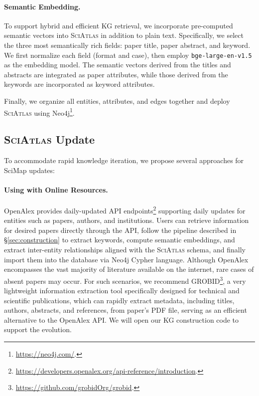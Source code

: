 \documentclass{llmxive}
\providecommand{\ours}{\textsc{SciAtlas}}
\begin{document}
\paragraph{Semantic Embedding.}
To support hybrid and efficient KG retrieval, we incorporate pre-computed semantic vectors into {\ours} in addition to plain text.
Specifically, we select the three most semantically rich fields: paper title, paper abstract, and keyword.
We first normalize each field (format and case), then employ \texttt{bge-large-en-v1.5} \citep{bge} as the embedding model.
The semantic vectors derived from the titles and abstracts are integrated as paper attributes, while those derived from the keywords are incorporated as keyword attributes.

Finally, we organize all entities, attributes, and edges together and deploy {\ours} using Neo4j\footnote{\url{https://neo4j.com/}.}.

\subsection{{\ours} Update}
To accommodate rapid knowledge iteration, we propose several approaches for SciMap updates:

\paragraph{Using with Online Resources.}
\label{sec:real_time_update}
OpenAlex provides daily-updated API endpoints\footnote{\url{https://developers.openalex.org/api-reference/introduction}.} supporting daily updates for entities such as papers, authors, and institutions. Users can retrieve information for desired papers directly through the API, follow the pipeline described in \S\ref{sec:construction} to extract keywords, compute semantic embeddings, and extract inter-entity relationships aligned with the {\ours} schema, and finally import them into the database via Neo4j Cypher language.
Although OpenAlex encompasses the vast majority of literature available on the internet, rare cases of absent papers may occur.
For such scenarios, we recommend GROBID\footnote{\url{https://github.com/grobidOrg/grobid}.}, a very lightweight information extraction tool specifically designed for technical and scientific publications, which can rapidly extract metadata, including titles, authors, abstracts, and references, from paper's PDF file, serving as an efficient alternative to the OpenAlex API.
We will open our KG construction code to support the evolution.
\end{document}
